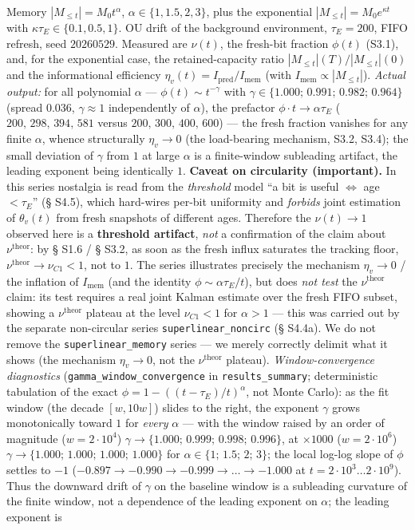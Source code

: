 \documentclass[12pt]{iopart}
\begin{document}
Memory \(|M_{\le t}| = M_0 t^\alpha\), \(\alpha \in \{1, 1.5, 2, 3\}\), plus the exponential \(|M_{\le t}| = M_0 e^{\kappa t}\) with \(\kappa\tau_E \in \{0.1, 0.5, 1\}\). OU drift of the background environment, \(\tau_E = 200\), FIFO refresh, seed \(20260529\). Measured are \(\nu(t)\), the fresh-bit fraction \(\phi(t)\) (S3.1), and, for the exponential case, the retained-capacity ratio \(|M_{\le t}|(T)/|M_{\le t}|(0)\) and the informational efficiency \(\eta_v(t) = I_{\text{pred}}/I_{\text{mem}}\) (with \(I_{\text{mem}} \propto |M_{\le t}|\)). \emph{Actual output:} for all polynomial \(\alpha\) --- \(\phi(t) \sim t^{-\gamma}\) with \(\gamma \in \{1.000;\,0.991;\,0.982;\,0.964\}\) (spread \(0.036\), \(\gamma \approx 1\) independently of \(\alpha\)), the prefactor \(\phi\cdot t \to \alpha\tau_E\) (\(200,\,298,\,394,\,581\) versus \(200,\,300,\,400,\,600\)) --- the fresh fraction vanishes for any finite \(\alpha\), whence structurally \(\eta_v \to 0\) (the load-bearing mechanism, S3.2, S3.4); the small deviation of \(\gamma\) from \(1\) at large \(\alpha\) is a finite-window subleading artifact, the leading exponent being identically \(1\). \textbf{Caveat on circularity (important).} In this series nostalgia is read from the \emph{threshold} model ``a bit is useful \(\Leftrightarrow\) age \(< \tau_E\)'' (§ S4.5), which hard-wires per-bit uniformity and \emph{forbids} joint estimation of \(\theta_v(t)\) from fresh snapshots of different ages. Therefore the \(\nu(t) \to 1\) observed here is a \textbf{threshold artifact}, \emph{not} a confirmation of the claim about \(\nu^{\text{theor}}\): by § S1.6 / § S3.2, as soon as the fresh influx saturates the tracking floor, \(\nu^{\text{theor}} \to \nu_{C1} < 1\), not to \(1\). The series illustrates precisely the mechanism \(\eta_v \to 0\) / the inflation of \(I_{\text{mem}}\) (and the identity \(\phi \sim \alpha\tau_E/t\)), but does \emph{not test} the \(\nu^{\text{theor}}\) claim: its test requires a real joint Kalman estimate over the fresh FIFO subset, showing a \(\nu^{\text{theor}}\) plateau at the level \(\nu_{C1} < 1\) for \(\alpha > 1\) --- this was carried out by the separate non-circular series \texttt{superlinear\_noncirc} (§ S4.4a). We do not remove the \texttt{superlinear\_memory} series --- we merely correctly delimit what it shows (the mechanism \(\eta_v \to 0\), not the \(\nu^{\text{theor}}\) plateau). \emph{Window-convergence diagnostics} (\texttt{gamma\_window\_convergence} in \texttt{results\_summary}; deterministic tabulation of the exact \(\phi = 1-((t-\tau_E)/t)^\alpha\), not Monte Carlo): as the fit window (the decade \([w, 10w]\)) slides to the right, the exponent \(\gamma\) grows monotonically toward \(1\) for \emph{every} \(\alpha\) --- with the window raised by an order of magnitude (\(w = 2\cdot10^4\)) \(\gamma \to \{1.000;\,0.999;\,0.998;\,0.996\}\), at \(\times1000\) (\(w = 2\cdot10^6\)) \(\gamma \to \{1.000;\,1.000;\,1.000;\,1.000\}\) for \(\alpha \in \{1;\,1.5;\,2;\,3\}\); the local log-log slope of \(\phi\) settles to \(-1\) (\(-0.897 \to -0.990 \to -0.999 \to \dots \to -1.000\) at \(t = 2\cdot10^3 \dots 2\cdot10^9\)). Thus the downward drift of \(\gamma\) on the baseline window is a subleading curvature of the finite window, not a dependence of the leading exponent on \(\alpha\); the leading exponent is 
\end{document}
